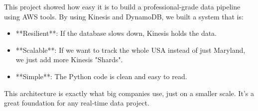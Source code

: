\documentclass[12pt, a4paper]{article}
\begin{document}
This project showed how easy it is to build a professional-grade data pipeline using AWS tools. By using Kinesis and DynamoDB, we built a system that is:
\begin{itemize}
    \item **Resilient**: If the database slows down, Kinesis holds the data.
    \item **Scalable**: If we want to track the whole USA instead of just Maryland, we just add more Kinesis "Shards".
    \item **Simple**: The Python code is clean and easy to read.
\end{itemize}

This architecture is exactly what big companies use, just on a smaller scale. It's a great foundation for any real-time data project.
\end{document}
